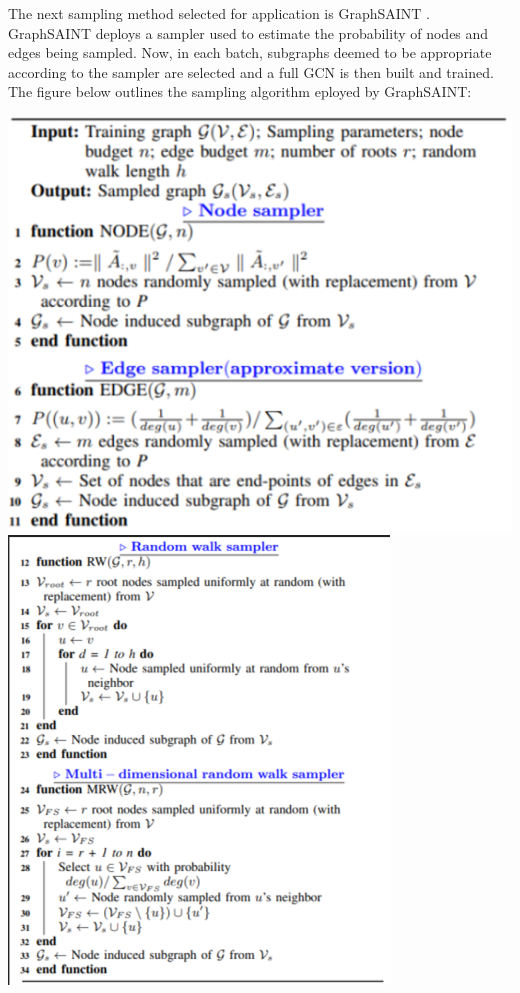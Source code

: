 \documentclass{article}
\begin{document}
	The next sampling method selected for application is GraphSAINT \cite{graphsaint-iclr20}. GraphSAINT deploys a sampler used to estimate the probability of nodes and edges being sampled. Now, in each batch, subgraphs deemed to be appropriate according to the sampler are selected and a full GCN is then built and trained.
	The figure below outlines the sampling algorithm eployed by GraphSAINT:
	
	\begin{center}
		\includegraphics[scale=0.4]{Figures/saint1.png}
		\includegraphics[scale=0.4]{Figures/saint2.png}
	\end{center}
	
\end{document}
